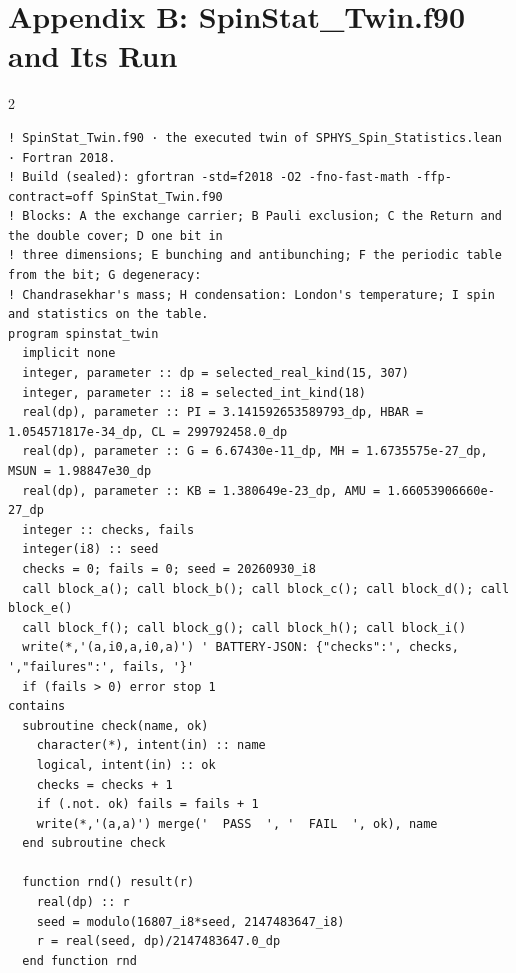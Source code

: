\documentclass[10pt]{article}
\begin{document}
\hypertarget{appendix-b-spinstat_twin.f90-and-its-run}{%
\section{Appendix B: SpinStat\_Twin.f90 and Its
Run}\label{appendix-b-spinstat_twin.f90-and-its-run}}

\begin{multicols}{2}
\begin{Verbatim}[fontsize=\fontsize{6.0}{6.9}\selectfont,breaklines,breakanywhere,breaksymbolleft={}]
! SpinStat_Twin.f90 · the executed twin of SPHYS_Spin_Statistics.lean · Fortran 2018.
! Build (sealed): gfortran -std=f2018 -O2 -fno-fast-math -ffp-contract=off SpinStat_Twin.f90
! Blocks: A the exchange carrier; B Pauli exclusion; C the Return and the double cover; D one bit in
! three dimensions; E bunching and antibunching; F the periodic table from the bit; G degeneracy:
! Chandrasekhar's mass; H condensation: London's temperature; I spin and statistics on the table.
program spinstat_twin
  implicit none
  integer, parameter :: dp = selected_real_kind(15, 307)
  integer, parameter :: i8 = selected_int_kind(18)
  real(dp), parameter :: PI = 3.141592653589793_dp, HBAR = 1.054571817e-34_dp, CL = 299792458.0_dp
  real(dp), parameter :: G = 6.67430e-11_dp, MH = 1.6735575e-27_dp, MSUN = 1.98847e30_dp
  real(dp), parameter :: KB = 1.380649e-23_dp, AMU = 1.66053906660e-27_dp
  integer :: checks, fails
  integer(i8) :: seed
  checks = 0; fails = 0; seed = 20260930_i8
  call block_a(); call block_b(); call block_c(); call block_d(); call block_e()
  call block_f(); call block_g(); call block_h(); call block_i()
  write(*,'(a,i0,a,i0,a)') ' BATTERY-JSON: {"checks":', checks, ',"failures":', fails, '}'
  if (fails > 0) error stop 1
contains
  subroutine check(name, ok)
    character(*), intent(in) :: name
    logical, intent(in) :: ok
    checks = checks + 1
    if (.not. ok) fails = fails + 1
    write(*,'(a,a)') merge('  PASS  ', '  FAIL  ', ok), name
  end subroutine check

  function rnd() result(r)
    real(dp) :: r
    seed = modulo(16807_i8*seed, 2147483647_i8)
    r = real(seed, dp)/2147483647.0_dp
  end function rnd


\end{Verbatim}
\end{multicols}
\end{document}
